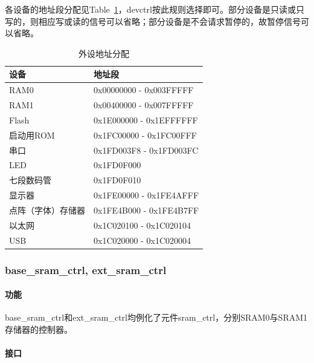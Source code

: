 \documentclass{article}
\begin{document}
\begin{spacing}{1.4}
各设备的地址段分配见Table~\ref{tb:dev-addr}，devctrl按此规则选择即可。部分设备是只读或只写的，则相应写或读的信号可以省略；部分设备是不会请求暂停的，故暂停信号可以省略。
\begin{table}[!htb]
\begin{center}
\begin{tabular}{p{7.5cm}|p{7.5cm}}
\hline
\textbf{设备}&\textbf{地址段} \\
\hline RAM0             & 0x00000000 - 0x003FFFFF \\
\hline RAM1             & 0x00400000 - 0x007FFFFF \\
\hline Flash            & 0x1E000000 - 0x1EFFFFFF \\
\hline 启动用ROM        & 0x1FC00000 - 0x1FC00FFF \\
\hline 串口             & 0x1FD003F8 - 0x1FD003FC \\
\hline LED              & 0x1FD0F000 \\
\hline 七段数码管       & 0x1FD0F010 \\
\hline 显示器           & 0x1FE00000 - 0x1FE4AFFF \\
\hline 点阵（字体）存储器&0x1FE4B000 - 0x1FE4B7FF \\
\hline 以太网           & 0x1C020100 - 0x1C020104 \\
\hline USB              & 0x1C020000 - 0x1C020004 \\
\hline
\end{tabular}
\caption{外设地址分配}
\label{tb:dev-addr}
\end{center}
\end{table}

\subsubsection{base\_sram\_ctrl, ext\_sram\_ctrl}

\paragraph{功能}\mbox{}

base\_sram\_ctrl和ext\_sram\_ctrl均例化了元件sram\_ctrl，分别SRAM0与SRAM1存储器的控制器。

\paragraph{接口}\mbox{}


\end{spacing}
\end{document}
